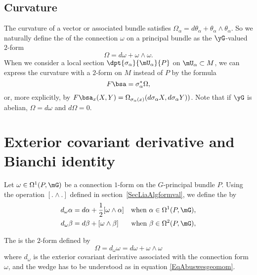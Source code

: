 \subsection{Curvature}

The curvature of a vector or associated bundle satisfies $\Omega_{\alpha}=d\theta_{\alpha}+\theta_{\alpha}\wedge\theta_{\alpha}$. So we naturally define the  of the connection $\omega$ on a principal bundle as the $\yG$-valued $2$-form
\begin{equation}
  \Omega=d\omega+\omega\wedge\omega.
\end{equation}
When we consider a local section\label{PgLocSecCurv} $\dpt{\sigma_{\alpha}}{\mU_{\alpha}}{P}$ on $\mU_{\alpha}\subset M$, we can express the curvature with a $2$-form on $M$ instead of $P$ by the formula \label{pg:curv_princ}
\[
 F\bsa=\sigma_{\alpha}^*\Omega,
\]
or, more explicitly, by $F\bsa_x(X,Y)=\Omega_{\sigma_{\alpha}(x)}(d\sigma_{\alpha} X,d\sigma_{\alpha} Y))$. Note that if $\yG$ is abelian, $\Omega=d\omega$ and $d\Omega=0$.

\section{Exterior covariant derivative and Bianchi identity}

Let $\omega\in\Omega^1(P,\mG)$ be a connection $1$-form on the $G$-principal bundle $P$. Using the operation $[.\wedge .]$ defined in section~\ref{SecLiaAlgformval}, we define the  by  %
\begin{align}
d_{\omega}\alpha&=d\alpha+\frac{ 1 }{2}[\omega\wedge\alpha]&\text{when }\alpha\in\Omega^1(P,\mG),\\
d_{\omega}\beta&=d\beta+[\omega\wedge\beta]&\text{when }\beta\in\Omega^2(P,\mG),
\end{align}

The  is the $2$-form defined by
\begin{equation}
\Omega=d_{\omega}\omega=d\omega+\omega\wedge\omega
\end{equation}
where $d_{\omega}$ is the exterior covariant derivative associated with the connection form $\omega$, and the wedge has to be understood as in equation \eqref{EqAbuswesgeomom}.


